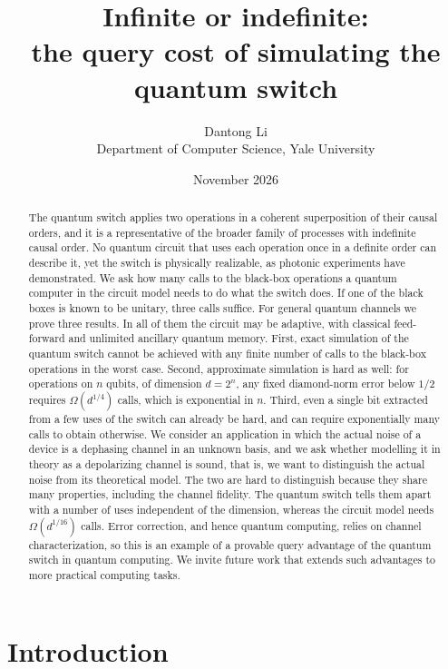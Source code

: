 \documentclass[11pt,letterpaper]{article}
\title{Infinite or indefinite:\\ the query cost of simulating the quantum switch}
\author{Dantong Li\\\small Department of Computer Science, Yale University}
\date{November 2026}
\theoremstyle{definition}\newtheorem{definition}[theorem]{Definition}
\begin{document}
\maketitle

\begin{abstract}
The quantum switch applies two operations in a coherent superposition
of their causal orders, and it is a representative of the broader
family of processes with indefinite causal order. No quantum circuit
that uses each operation once in a definite order can describe it, yet
the switch is physically realizable, as photonic experiments have
demonstrated. We ask how many calls to the black-box operations a
quantum computer in the circuit model needs to do what the switch does.
If one of the black boxes is known to be unitary, three calls suffice.
For general quantum channels we prove three results. In all of them the
circuit may be adaptive, with classical feed-forward and unlimited
ancillary quantum memory. First, exact simulation of the quantum switch
cannot be achieved with any finite number of calls to the black-box
operations in the worst case. Second, approximate simulation is hard as well:
for operations on $n$ qubits, of dimension $d=2^n$, any fixed
diamond-norm error below $1/2$ requires $\Omega(d^{1/4})$ calls, which
is exponential in $n$. Third, even a single bit extracted from a few
uses of the switch can already be hard, and can require exponentially
many calls to obtain otherwise. We consider an application in which the
actual noise of a device is a dephasing channel in an unknown basis,
and we ask whether modelling it in theory as a depolarizing channel is
sound, that is, we want to distinguish the actual noise from its
theoretical model. The two are hard to distinguish because they share
many properties, including the channel fidelity. The quantum switch tells
them apart with a number of uses independent of the dimension, whereas
the circuit model needs $\Omega(d^{1/16})$ calls. Error correction, and
hence quantum computing, relies on channel characterization, so this is
an example of a provable query advantage of the quantum switch in
quantum computing. We invite future work that extends such advantages
to more practical computing tasks.
\end{abstract}

\section{Introduction}
\end{document}
